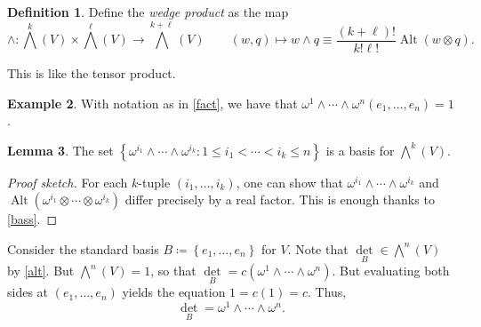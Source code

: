 \documentclass[10pt,letterpaper,cm]{nupset}
\theoremstyle{definition}
\newtheorem{definition}{Definition}[subsection]
\newtheorem{exmp}[definition]{Example}
\theoremstyle{theorem}
\newtheorem{lemma}[definition]{Lemma}
\theoremstyle{remark}
\newcommand{\1}{\mathbf{1}}
\newcommand{\0}{\vec 0}
\DeclareMathOperator{\Alt}{Alt}
\begin{document}
\begin{definition}\label{WP}
Define the \textit{wedge product} as the map $$\wedge : \bigwedge^k(V) \times \bigwedge^{\ell}(V) \to \bigwedge^{k+\ell}(V) \quad \quad (w, q) \mapsto w \wedge q \equiv  \frac{(k+\ell)!}{k! \ell!}\Alt(w\otimes q).$$  
\end{definition}

This is like the tensor product. 

\begin{exmp}
With notation as in \cref{fact}, we have that $\omega^1 \wedge \cdots \wedge \omega^n(e_1, \ldots, e_n) =1$.
\end{exmp}

\begin{lemma}
The set $\left\{\omega^{i_1} \wedge \cdots \wedge \omega^{i_k}  : 1 \leq i_1 < \cdots < i_k \leq n\right\}$ is a basis for $\bigwedge^k(V)$.
\end{lemma}
\begin{proof}[Proof sketch]
For each $k$-tuple $\left(i_1, \ldots, i_k\right)$, one can show that $\omega^{i_1} \wedge \cdots \wedge \omega^{i_k}$ and $\Alt(\omega^{i_1} \otimes \cdots \otimes \omega^{i_k} )$ differ precisely by a real factor. This is enough thanks to \cref{bass}.
\end{proof}

\smallskip

Consider the standard basis $B \coloneqq   \left\{e_1, \ldots, e_n\right\}$ for $V$. Note that $\underset{B}{\det} \in \bigwedge^n(V)$ by \cref{alt}.
But $\bigwedge^n(V) = 1$, so that $\underset{B}{\det} = c(\omega^1 \wedge \cdots \wedge \omega^n)$. But evaluating both sides at $\left(e_1, \ldots, e_n\right)$ yields the equation $1 = c(1) = c$. Thus, $$\underset{B}{\det} = \omega^1 \wedge \cdots \wedge \omega^n.$$

\smallskip
\end{document}
